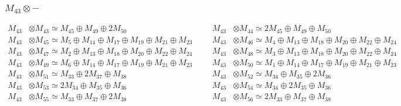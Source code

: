 \subsubsection{$ M_{43}\otimes -$}
\begin{align*}
M_{43} &\otimes M_{43} \simeq M_{45} \oplus M_{49} \oplus 2M_{50} &&& M_{43} &\otimes M_{44} \simeq 2M_{45} \oplus M_{49} \oplus M_{50}\\
M_{43} &\otimes M_{45} \simeq M_{5} \oplus M_{14} \oplus M_{17} \oplus M_{19} \oplus M_{21} \oplus M_{23} &&& M_{43} &\otimes M_{46} \simeq M_{4} \oplus M_{13} \oplus M_{18} \oplus M_{20} \oplus M_{22} \oplus M_{24}\\
M_{43} &\otimes M_{47} \simeq M_{2} \oplus M_{13} \oplus M_{18} \oplus M_{20} \oplus M_{22} \oplus M_{24} &&& M_{43} &\otimes M_{48} \simeq M_{3} \oplus M_{13} \oplus M_{18} \oplus M_{20} \oplus M_{22} \oplus M_{24}\\
M_{43} &\otimes M_{49} \simeq M_{6} \oplus M_{14} \oplus M_{17} \oplus M_{19} \oplus M_{21} \oplus M_{23} &&& M_{43} &\otimes M_{50} \simeq M_{1} \oplus M_{14} \oplus M_{17} \oplus M_{19} \oplus M_{21} \oplus M_{23}\\
M_{43} &\otimes M_{51} \simeq M_{33} \oplus 2M_{37} \oplus M_{38} &&& M_{43} &\otimes M_{52} \simeq M_{34} \oplus M_{35} \oplus 2M_{36}\\
M_{43} &\otimes M_{53} \simeq 2M_{34} \oplus M_{35} \oplus M_{36} &&& M_{43} &\otimes M_{54} \simeq M_{34} \oplus 2M_{35} \oplus M_{36}\\
M_{43} &\otimes M_{55} \simeq M_{33} \oplus M_{37} \oplus 2M_{38} &&& M_{43} &\otimes M_{56} \simeq 2M_{33} \oplus M_{37} \oplus M_{38}\\
\end{align*}

